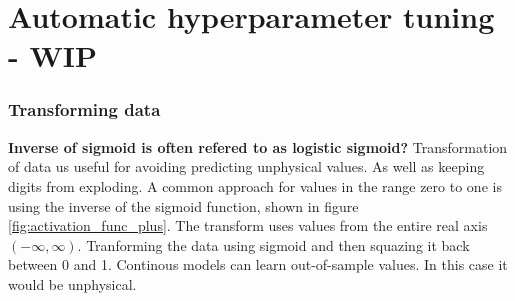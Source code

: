 \section{Automatic hyperparameter tuning - WIP}



\subsubsection{Transforming data} \label{sec:transforming_cloud_cover}
\textbf{Inverse of sigmoid is often refered to as logistic sigmoid?}
Transformation of data us useful for avoiding predicting unphysical values. As well as keeping digits from exploding.
A common approach for values in the range zero to one is using the inverse of the sigmoid function, shown in figure \ref{fig:activation_func_plus}. The transform uses values from the entire real axis $(-\infty, \infty)$. 
%
Tranforming the data using sigmoid and then squazing it back between 0 and 1. 
Continous models can learn out-of-sample values. In this case it would be unphysical.

